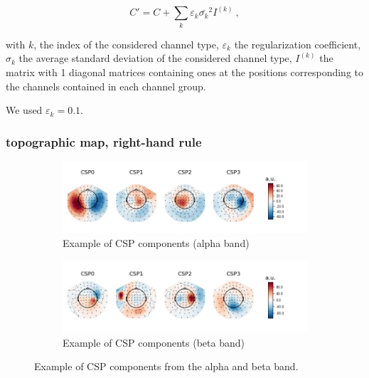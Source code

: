 \begin{equation}
    C' = C + \sum_k {\varepsilon_k \bar{\sigma_k}^2 I^{(k)}}\ ,
\end{equation}

with $k$, the index of the considered channel type, $\varepsilon_k$ the regularization coefficient, $\sigma_k$ the average standard deviation of the considered channel type, $I^{(k)}$ the matrix with 1 diagonal matrices containing ones at the positions corresponding to the channels contained in each channel group.

We used $\varepsilon_k = 0.1$.


\subsubsection{topographic map, right-hand rule}

\begin{figure}
    \centering
    \begin{subfigure}[b]{0.55\textwidth}
       \includegraphics[width=1\linewidth]{images_report/sensor/csp_individual/sub_155_alpha.png}
       \caption{Example of CSP components (alpha band)}
       \label{fig:csp_component_alpha_band}
    \end{subfigure}
    
    \begin{subfigure}[b]{0.55\textwidth}
       \includegraphics[width=1\linewidth]{images_report/sensor/csp_individual/sub_215_beta.png}
       \caption{Example of CSP components (beta band)}
       \label{fig:csp_component_beta_band}
    \end{subfigure}

    \caption[Example of CSP components from the alpha and beta band.]%
    {Example of CSP components from the alpha and beta band.}
    \label{example_csp_component}
\end{figure}

